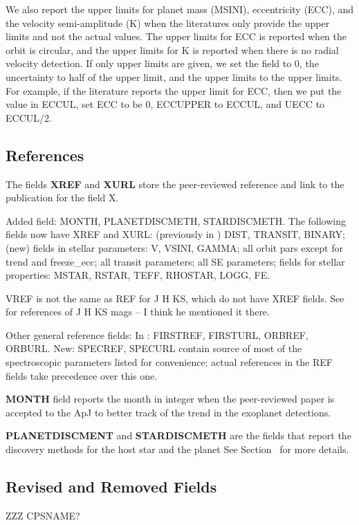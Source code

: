 \documentclass[11pt,preprint]{aastex}
\begin{document}
\begin{CJK*}{UTF8}{gbsn}
We also report the upper limits for planet mass (MSINI), eccentricity
(ECC), and the velocity semi-amplitude (K) when the literatures only
provide the upper limits and not the actual values. The upper limits
for ECC is reported when the orbit is circular, and the upper limits
for K is reported when there is no radial velocity detection. If only
upper limits are given, we set the field to 0, the uncertainty to half
of the upper limit, and the upper limits to the upper limits. For
example, if the literature reports the upper limit for ECC, then we
put the value in ECCUL, set ECC to be 0, ECCUPPER to ECCUL, and UECC
to ECCUL/2.


\subsection{References}\label{sec:ref}

The fields {\bf XREF} and {\bf XURL} store the peer-reviewed reference and link to
the publication for the field X. 

Added field: MONTH, PLANETDISCMETH, STARDISCMETH.
The following fields now have XREF and XURL: (previously in
\cite{Wright2011}) DIST, TRANSIT, BINARY; (new) fields in stellar
parameters: V, VSINI, GAMMA; all orbit pars except for trend and
freeze\_ecc; all transit parameters; all SE parameters; fields for
stellar properties: MSTAR, RSTAR, TEFF, RHOSTAR, LOGG, FE. 

VREF is not the same as REF for J H KS, which do not have XREF
fields. See \cite{Wright2011} for references of J H KS mags -- I think
he mentioned it there.

Other general reference fields: In \cite{Wright2011}: FIRSTREF,
FIRSTURL, ORBREF, ORBURL. New: SPECREF, SPECURL contain source of most
of the spectroscopic parameters listed for convenience; actual
references in the REF fields take precedence over this one.

{\bf MONTH} field reports the month in integer when the
peer-reviewed paper is accepted to the ApJ to better track of the
trend in the exoplanet detections.

{\bf PLANETDISCMENT} and {\bf STARDISCMETH} are the fields that report
the discovery methods for the host star and the planet See Section~
for more details.


\subsection{Revised and Removed Fields}
ZZZ CPSNAME?


\end{CJK*}
\end{document}
